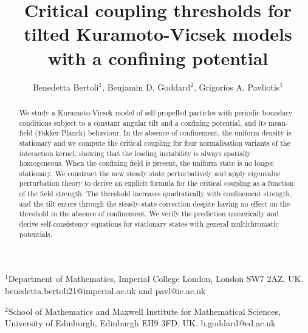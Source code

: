 \documentclass[a4paper,11pt]{article}
\date{}
\title{Critical coupling thresholds for tilted Kuramoto-Vicsek models with a confining potential}
\author{Benedetta Bertoli$^1$, Benjamin D. Goddard$^2$, Grigorios A. Pavliotis$^1$}
\theoremstyle{plain}
\theoremstyle{definition}
\theoremstyle{remark}
\begin{document}
\maketitle

{\small \noindent $^1$Department of Mathematics, Imperial College London, London SW7 2AZ, UK.
\\
benedetta.bertoli21@imperial.ac.uk and pavl@ic.ac.uk
}

{\small \noindent $^2$School of Mathematics and Maxwell Institute for Mathematical Sciences, University of Edinburgh, Edinburgh EH9 3FD, UK. b.goddard@ed.ac.uk}

\begin{abstract}
We study a Kuramoto-Vicsek model of self-propelled particles with periodic boundary conditions subject to a constant angular tilt and a confining potential, and its mean-field (Fokker-Planck) behaviour. In the absence of confinement, the uniform density is stationary and we compute the critical coupling for four normalisation variants of the interaction kernel, showing that the leading instability is always spatially homogeneous. When the confining field is present, the uniform state is no longer stationary. We construct the new steady state perturbatively and apply eigenvalue perturbation theory to derive an explicit formula for the critical coupling as a function of the field strength. The threshold increases quadratically with confinement strength, and the tilt enters through the steady-state correction despite having no effect on the threshold in the absence of confinement. We verify the prediction numerically and derive self-consistency equations for stationary states with general multichromatic potentials.
\end{abstract}
 
\end{document}
